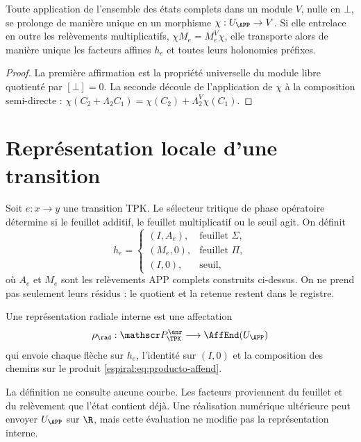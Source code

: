 \begin{proposition}
Toute application de l'ensemble des états complets dans un module \(V\), nulle en \(\bot\), se prolonge de manière unique en un morphisme \(\chi:U_{\APP}\to V\). Si elle entrelace en outre les relèvements multiplicatifs, \(\chi M_e=M_e^V\chi\), elle transporte alors de manière unique les facteurs affines \(h_e\) et toutes leurs holonomies préfixes.
\end{proposition}
\begin{proof}
La première affirmation est la propriété universelle du module libre quotienté par \([\bot]=0\). La seconde découle de l'application de \(\chi\) à la composition semi-directe : \(\chi(C_2+\Lambda_2C_1)=
\chi(C_2)+\Lambda_2^V\chi(C_1)\).
\end{proof}

\section{Représentation locale d'une transition}

Soit \(e:x\to y\) une transition TPK. Le sélecteur tritique de phase opératoire détermine si le feuillet additif, le feuillet multiplicatif ou le seuil agit. On définit
\begin{equation}
 h_e=
 \begin{cases}
 (I,A_e),&\text{feuillet }\Sigma,\\
 (M_e,0),&\text{feuillet }\Pi,\\
 (I,0),&\text{seuil},
 \end{cases}
 \label{espiral:eq:factor-afin-local}
\end{equation}
où \(A_e\) et \(M_e\) sont les relèvements APP complets construits ci-dessus. On ne prend pas seulement leurs résidus : le quotient et la retenue restent dans le registre.

\begin{definition}
Une représentation radiale interne est une affectation
\[
 \rho_{\rad}:\mathscr P_{\TPK}^{\enr}
 \longrightarrow\AffEnd(U_{\APP})
\]
qui envoie chaque flèche sur \(h_e\), l'identité sur \((I,0)\) et la composition des chemins sur le produit \cref{espiral:eq:producto-affend}.
\end{definition}

La définition ne consulte aucune courbe. Les facteurs proviennent du feuillet et du relèvement que l'état contient déjà. Une réalisation numérique ultérieure peut envoyer \(U_{\APP}\) sur \(\R\), mais cette évaluation ne modifie pas la représentation interne.

